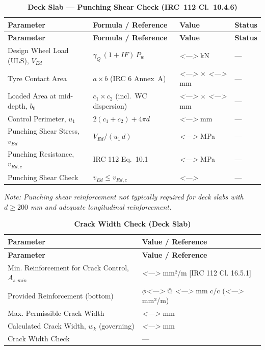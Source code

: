 \documentclass[12pt,a4paper]{report}
\numberwithin{table}{chapter}
\numberwithin{figure}{chapter}
\newcommand{\ReportTableGap}{\vspace{1em}}
\newcommand{\placeholder}[1]{\textit{\textless #1\textgreater}}
\begin{document}
\ReportTableGap
\begin{longtable}{|L{5.5cm}|C{3.5cm}|>{\centering\arraybackslash}p{4.5cm}|C{2cm}|}
\caption{\textbf{Deck Slab --- Punching Shear Check (IRC~112 Cl.~10.4.6)}}\\
\hline
\textbf{Parameter} & \textbf{Formula / Reference} & \textbf{Value} & \textbf{Status} \\[6pt]
\hline
\endfirsthead
\hline
\textbf{Parameter} & \textbf{Formula / Reference} & \textbf{Value} & \textbf{Status} \\[6pt]
\hline
\endhead

Design Wheel Load (ULS), $V_{Ed}$ & $\gamma_Q\,(1+IF)\,P_w$ & \placeholder{---} kN & --- \\[6pt]
\hline
Tyre Contact Area & $a \times b$ (IRC 6 Annex~A) & \placeholder{---} $\times$ \placeholder{---} mm & --- \\[6pt]
\hline
Loaded Area at mid-depth, $b_0$ & $c_1 \times c_2$ (incl.\ WC dispersion) & \placeholder{---} $\times$ \placeholder{---} mm & --- \\[6pt]
\hline
Control Perimeter, $u_1$ & $2(c_1+c_2) + 4\pi d$ & \placeholder{---} mm & --- \\[6pt]
\hline
Punching Shear Stress, $v_{Ed}$ & $V_{Ed} / (u_1\,d)$ & \placeholder{---} MPa & --- \\[6pt]
\hline
Punching Resistance, $v_{Rd,c}$ & IRC 112 Eq.\ 10.1 & \placeholder{---} MPa & --- \\[6pt]
\hline
Punching Shear Check & $v_{Ed} \leq v_{Rd,c}$ & \placeholder{---} & --- \\[6pt]
\hline
\end{longtable}
\noindent\textit{Note: Punching shear reinforcement not typically required for deck slabs with $d \geq 200$ mm and adequate longitudinal reinforcement.}

\ReportTableGap
\clearpage
\begin{longtable}{|L{7cm}|>{\arraybackslash}p{8.5cm}|}
\caption{\textbf{Crack Width Check (Deck Slab)}}\\
\hline
\textbf{Parameter} & \textbf{Value / Reference} \\[6pt]
\hline
\endfirsthead
\hline
\textbf{Parameter} & \textbf{Value / Reference} \\[6pt]
\hline
\endhead

\textnormal{Min. Reinforcement for Crack Control, $A_{s,min}$} & \placeholder{---} mm²/m [IRC 112 Cl. 16.5.1] \\[6pt]
\hline
\textnormal{Provided Reinforcement (bottom)} & $\phi$\placeholder{---} @ \placeholder{---} mm c/c (\placeholder{---} mm²/m) \\[6pt]
\hline
\textnormal{Max. Permissible Crack Width} & \placeholder{---} mm \\[6pt]
\hline
\textnormal{Calculated Crack Width, $w_k$ (governing)} & \placeholder{---} mm \\[6pt]
\hline
\textnormal{Crack Width Check} & --- \\[6pt]
\hline
\end{longtable}
\end{document}
